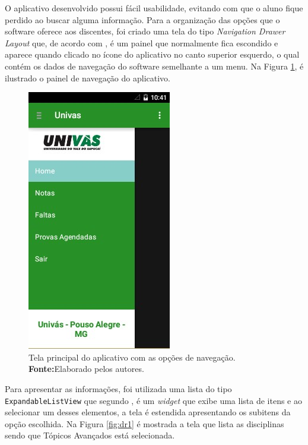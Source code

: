     \par O aplicativo desenvolvido possui fácil usabilidade, evitando com que o
aluno fique perdido ao buscar alguma informação. Para a organização das opções
que o software oferece aos discentes, foi criado uma tela do tipo
\textit{Navigation Drawer Layout} que, de acordo com ,
é um painel que normalmente fica escondido e aparece quando clicado no ícone do
aplicativo no canto superior esquerdo, o qual contém os dados de navegação do
software semelhante a um menu. Na Figura \ref{fig:dr}, é ilustrado o painel de
navegação do aplicativo.
     
\begin{figure}[h!]
    \centerline{\includegraphics[scale=0.8]{./imagens/3_discussao_resultados/dr.jpg}}
    \caption[Tela principal do aplicativo com as opções de navegação]{Tela
    principal do aplicativo com as opções de navegação.
    \textbf{Fonte:}Elaborado pelos autores.}
    \label{fig:dr}
\end{figure}

    \par Para apresentar as informações, foi utilizada uma lista do tipo
\texttt{ExpandableListView} que segundo , é um
\textit{widget} que exibe uma lista de itens e ao selecionar um desses
elementos, a tela é estendida apresentando os subitens da opção escolhida. Na
Figura \ref{fig:dr1} é mostrada a tela que lista as disciplinas sendo que
Tópicos Avançados está selecionada.


